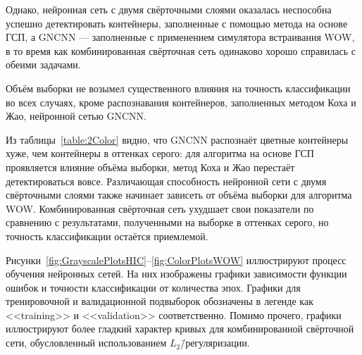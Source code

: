 Однако, нейронная сеть с двумя свёрточными слоями оказалась неспособна успешно детектировать контейнеры, заполненные с помощью метода на основе ГСП, а GNCNN --- заполненные с применением симулятора встраивания WOW, в то время как комбинированная свёрточная сеть одинаково хорошо справилась с обеими задачами.

Объём выборки не возымел существенного влияния на точность классификации во всех случаях, кроме распознавания контейнеров, заполненных методом Коха и Жао, нейронной сетью GNCNN.

Из таблицы~\ref{table:2Color} видно, что GNCNN распознаёт цветные контейнеры хуже, чем контейнеры в оттенках серого: для алгоритма на основе ГСП проявляется влияние объёма выборки, метод Коха и Жао перестаёт детектироваться вовсе. Различающая способность нейронной сети с двумя свёрточными слоями также начинает зависеть от объёма выборки для алгоритма WOW. Комбинированная свёрточная сеть ухудшает свои показатели по сравнению с результатами, полученными на выборке в оттенках серого, но точность классификации остаётся приемлемой.

Рисунки~\ref{fig:GrayscalePlotsHIC}--\ref{fig:ColorPlotsWOW} иллюстрируют процесс обучения нейронных сетей. На них изображены графики зависимости функции ошибок и точности классификации от количества эпох. Графики для тренировочной и валидационной подвыборок обозначены в легенде как <<training>> и <<validation>> соответственно. Помимо прочего, графики иллюстрируют более гладкий характер кривых для комбинированной свёрточной сети, обусловленный использованием $ L_2 $\=/регуляризации.

